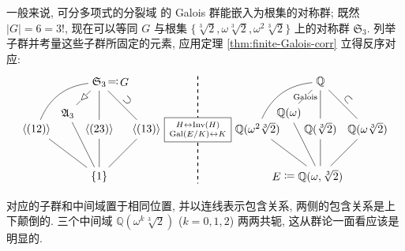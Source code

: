 \begin{example}
	一般来说, 可分多项式的分裂域 的 Galois 群能嵌入为根集的对称群; 既然 $|G|=6=3!$, 现在可以等同 $G$ 与根集 $\{ \sqrt[3]{2}, \omega\sqrt[3]{2}, \omega^2\sqrt[3]{2} \}$ 上的对称群 $\mathfrak{S}_3$. 列举子群并考量这些子群所固定的元素, 应用定理 \ref{thm:finite-Galois-corr} 立得反序对应:
	\[\begin{tikzpicture}
		[baseline = (current bounding box.center),
		every node/.style={ },
		every edge/.style={draw},
		normaledge/.style={ sloped, edge node={node[fill=white, outer sep=0.2mm, inner sep=0mm] {$\lhd$}} }
		]
		\begin{scope}
			\node (G) at (0, 3) {$\mathfrak{S}_3$};
			\node (extra) at (0.8,3) {$G$};
			\draw (G) edge[draw=none, edge node={node {$\eqqcolon$}}] (extra);
			\node (A) at (-1, 2) {$\mathfrak{A}_3$};
			\node (H1) at (-2,1.5) {$\langle(1 2)\rangle$};
			\node (H2) at (0,1.5) {$\langle(2 3)\rangle$};
			\node (H3) at (1.5,1.5) {$\langle(1 3)\rangle$};
			\node (E) at (0, 0) {$\{1\}$};
		\end{scope}
		\draw (G) edge[normaledge] (A);
		\draw (G) edge[bend right=30] (H1);  \draw (G) edge (H2);  \draw (G) edge[sloped, edge label={$\supset$}] (H3);
		\foreach \x in {A, H1, H2, H3}
		\draw (\x) edge (E);
	\end{tikzpicture} 
	\begin{tikzpicture}[baseline= (current bounding box.center)]
		\draw[thick, dashed] (0, 1.7) -- (0, -1.7);
		\node[draw, fill=white] at (0,0) {$H\leftrightarrow \Inv(H)\atop \Gal(E/K)\leftrightarrow K$};
	\end{tikzpicture}  \begin{tikzpicture}
		[baseline = (current bounding box.center),
		every node/.style={ },
		every edge/.style={draw},
		normaledge/.style={edge node={node[fill=white, outer sep=0.2mm, inner sep=0mm] {\scriptsize$\text{Galois}$}} }
		]
		\begin{scope}
			\node (FG) at (0,3) {$\mathbb{Q}$};
			\node (FA) at (-1, 2) {$\mathbb{Q}(\omega)$};
			\node (FH1) at (-2, 1.5) {$\mathbb{Q}(\omega^2 \sqrt[3]{2})$};
			\node (FH2) at (0,1.5) {$\mathbb{Q}(\sqrt[3]{2})$};
			\node (FH3) at (1.5,1.5) {$\mathbb{Q}(\omega\sqrt[3]{2})$};
			\node (FE) at (0,0) {$\mathbb{Q}(\omega, \sqrt[3]{2})$};
			\node (extra) at (-1.4,0) {$E$};
			\draw (FE) edge[draw=none, edge node={node {$\coloneqq$}}] (extra);
		\end{scope}
		\draw (FG) edge[normaledge] (FA);
		\draw (FG) edge[bend right=30] (FH1);  \draw (FG) edge (FH2);  \draw (FG) edge[sloped, edge label={$\subset$}] (FH3);
		\foreach \x in {A, H1, H2, H3}
		\draw (F\x) edge (FE);
	\end{tikzpicture}\]
	
	对应的子群和中间域置于相同位置, 并以连线表示包含关系, 两侧的包含关系是上下颠倒的. 三个中间域 $\mathbb{Q}(\omega^k \sqrt[3]{2})$ ($k=0,1,2$) 两两共轭, 这从群论一面看应该是明显的.
\end{example}